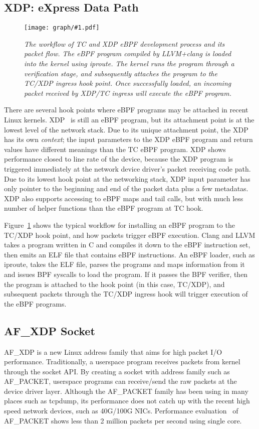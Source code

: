 \documentclass[10pt]{sigplanconf}
\newcommand{\myfig}[3]
 {
 \begin{figure}
 \centerline{\texttt{[image: graph/\#1.pdf]}}
 \caption{\sl \small #3}
 \label{#1:fig}
 \vspace*{-0.15in}
 \end{figure}
 }
\begin{document}
\subsection{XDP: eXpress Data Path}
\myfig{tcebpf}{2.6in}{The workflow of TC and XDP eBPF development process and its
packet flow.  The eBPF program compiled by LLVM+clang is loaded into the kernel
using iproute. The kernel runs the program through a verification stage, and
subsequently attaches the program to the TC/XDP ingress hook point.  Once
successfully loaded, an incoming packet received by XDP/TC ingress will execute the
eBPF program.}

There are several hook points where eBPF programs may be attached in recent
Linux kernels. XDP~\cite{xdp,xdp2} is still an eBPF program, but its attachment point is at the
lowest level of the network stack.  Due to its unique attachment point, the XDP
has its own {\em context}; the input parameters to the XDP eBPF program and return
values have different meanings than the TC eBPF program. XDP shows performance
closed to line rate of the device, because the XDP program is triggered immediately
at the network device driver's packet receiving code path.
Due to its lowest hook point at the networking stack, XDP input parameter has only
pointer to the beginning and end of the packet data plus a few metadatas.
XDP also supports accessing to eBPF maps and tail calls, but with much
less number of helper functions than the eBPF program at TC hook.

Figure~\ref{tcebpf:fig}
shows the typical workflow for installing an eBPF program to the TC/XDP hook point,
and how packets trigger eBPF execution.  Clang and LLVM takes a program
written in C and compiles it down to the eBPF instruction set, then emits an
ELF file that contains eBPF instructions.  An eBPF loader, such as iproute,
takes the ELF file, parses the programs and maps information from it and
issues BPF syscalls to load the program.  If it passes the BPF verifier,
then the program is attached to the hook point (in this case, TC/XDP), and
subsequent packets through the TC/XDP ingress hook will trigger execution of the
eBPF programs.

\subsection{AF\_XDP Socket}
AF\_XDP is a new Linux address family that aims for high packet I/O
performance. Traditionally, a userspace program receives packets from
kernel through the socket API.  By creating a socket with address family
such as AF\_PACKET, userspace programs can receive/send the raw packets
at the device driver layer.  Although the AF\_PACKET family has been using
in many places such as tcpdump, its performance does not catch up with the
recent high speed network devices, such as 40G/100G NICs.
Performance evaluation~\cite{af_packet_v4,af_packet_performance} of AF\_PACKET
shows less than 2 million packets per second using single core.
\end{document}
